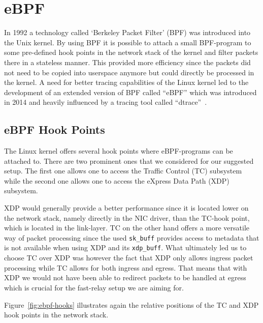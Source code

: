 \section{eBPF}\label{sec:ebpf_bg}
In 1992 a technology called `Berkeley Packet Filter' (BPF) was introduced into 
the Unix kernel.
By using BPF it is possible to attach a small BPF-program to some pre-defined hook points in 
the network stack of the kernel and filter packets there in a stateless manner.
This provided more efficiency since the packets did not need to be copied into 
userspace anymore but could directly be processed in the kernel.
A need for better tracing capabilities of the Linux kernel led to the development 
of an extended version of BPF called ``eBPF'' which was introduced in 2014 and 
heavily influenced by a tracing tool called ``dtrace''~\parencite{ebpf-intro-tigera}.

\subsection{eBPF Hook Points}
The Linux kernel offers several hook points where eBPF-programs can be attached to.
There are two prominent ones that we considered for our suggested setup.
The first one allows one to access the Traffic Control (TC) subsystem
while the second one allows one to access the eXpress Data Path (XDP) subsystem.

XDP would generally provide a better performance since it is located 
lower on the network stack, namely directly in the NIC driver, than the 
TC-hook point, which is located in the link-layer.
TC on the other hand offers a more versatile way of packet processing since 
the used \verb|sk_buff| provides access to metadata that is not available when using 
XDP and its \verb|xdp_buff|.
What ultimately led us to choose TC over XDP was however the fact that 
XDP only allows ingress packet processing while TC allows for both ingress and egress.
That means that with XDP we would not have been able to redirect packets to be handled 
at egress which is crucial for the fast-relay setup we are aiming for.

Figure~\autoref{fig:ebpf-hooks} illustrates again the relative positions of the TC and
XDP hook points in the network stack.

